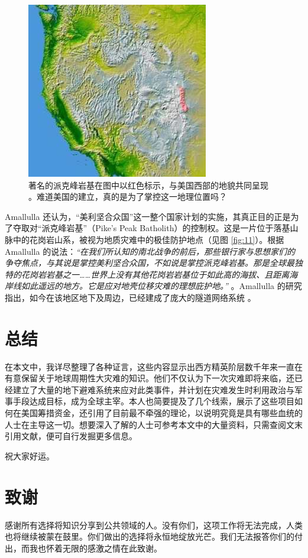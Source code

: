 \documentclass[10pt,twocolumn,letterpaper]{article}
\begin{document}
\begin{figure}[t]
\begin{center}
   \includegraphics[width=1\linewidth]{pike.jpg}
\end{center}
   \caption{著名的派克峰岩基在图中以红色标示，与美国西部的地貌共同呈现 \cite{36}。难道美国的建立，真的是为了掌控这一地理位置吗？}
\label{fig:11}
\label{fig:onecol}
\end{figure}

Amallulla 还认为，“美利坚合众国”这一整个国家计划的实施，其真正目的正是为了夺取对“派克峰岩基”（Pike’s Peak Batholith）的控制权。这是一片位于落基山脉中的花岗岩山系，被视为地质灾难中的极佳防护地点（见图 \ref{fig:11}）。根据 Amallulla 的说法：\textit{“在我们所认知的南北战争的前后，那些银行家与思想家们的争夺焦点，与其说是掌控美利坚合众国，不如说是掌控派克峰岩基。那是全球最独特的花岗岩岩基之一……世界上没有其他花岗岩岩基位于如此高的海拔、且距离海岸线如此遥远的地方。它是应对地壳位移灾难的理想庇护地。”} \cite{33,34}。Amallulla 的研究指出，如今在该地区地下及周边，已经建成了庞大的隧道网络系统 \cite{36}。
\section{总结}

在本文中，我详尽整理了各种证言，这些内容显示出西方精英阶层数千年来一直在有意保留关于地球周期性大灾难的知识。他们不仅认为下一次灾难即将来临，还已经建立了大量的地下避难系统来应对此类事件，并计划在灾难发生时利用政治与军事手段达成目标，成为全球主宰。本人也简要提及了几个线索，展示了这些项目如何在美国筹措资金，还引用了目前最不牵强的理论，以说明究竟是具有哪些血统的人士在主导这一切。想要深入了解的人士可参考本文中的大量资料，只需查阅文末引用文献，便可自行发掘更多信息。

祝大家好运。

\section{致谢}

感谢所有选择将知识分享到公共领域的人。没有你们，这项工作将无法完成，人类也将继续被蒙在鼓里。你们做出的选择将永恒地绽放光芒。我们无法报答你们的付出，而我也怀着无限的感激之情在此致谢。

\clearpage
\twocolumn

{\small


}
\end{document}
